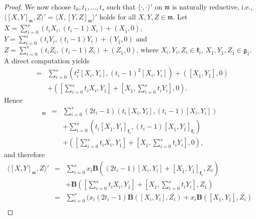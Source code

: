 \documentclass[reqno]{amsart}
\theoremstyle{definition}
\begin{document}
\begin{proof}
We now choose $t_{0},t_{1},\ldots,t_{s}$ such that  $\langle\cdot,\cdot\rangle'$ on $\mathfrak{m}$ is naturally reductive, i.e., $\langle [X,Y]_{\mathfrak{m}},Z\rangle'=\langle X,[Y,Z]_{\mathfrak{m}}\rangle'$ holds for all $X,Y,Z\in\mathfrak{m}$. Let
$X=\sum_{i=0}^{s}(t_{i}X_{i},(t_{i}-1)X_{i})+(X_{\bar{1}},0)$,
$Y=\sum_{i=0}^{s}(t_{i}Y_{i},(t_{i}-1)Y_{i})+(Y_{\bar{1}},0)$
and $Z=\sum_{i=0}^{s}(t_{i}Z_{i},(t_{i}-1)Z_{i})+(Z_{\bar{1}},0)$,
where $X_{i},Y_{i},Z_{i}\in\mathfrak{k}_{i}$, $X_{\bar{1}},Y_{\bar{1}},Z_{\bar{1}}\in\mathfrak{g}_{\bar{1}}$.
A direct computation yields
\begin{eqnarray*}
[X,Y]&=& \sum_{i=0}^{s}\left( t_{i}^{2}[X_{i},Y_{i}],(t_{i}-1)^{2}[X_{i},Y_{i}] \right)
         +\left( [X_{\bar{1}},Y_{\bar{1}}],0\right) \\
      && +\left(
         \left[\sum_{i=0}^{s}t_{i}X_{i},Y_{\bar{1}}\right] +\left[ X_{\bar{1}},\sum_{i=0}^{s}t_{i}Y_{i}\right], 0
         \right).
\end{eqnarray*}
Hence
\begin{eqnarray*}
[X,Y]_{\mathfrak{m}}&=& \sum_{i=0}^{s}(2t_{i}-1)\left( t_{i}[X_{i},Y_{i}],(t_{i}-1)[X_{i},Y_{i}]\right)\\
                     && +\sum_{i=0}^{s} \left( t_{i}[X_{\bar{1}},Y_{\bar{1}}]_{\mathfrak{k}_{i}},(t_{i}-1)[X_{\bar{1}},Y_{\bar{1}}]_{\mathfrak{k}_{i}}\right)\\
                     && +\left(
                         \left[ \sum_{i=0}^{s}t_{i}X_{i},Y_{\bar{1}}\right] +\left[ X_{\bar{1}},\sum_{i=0}^{s}t_{i}Y_{i}\right],0
                         \right),
\end{eqnarray*}
and therefore
\begin{eqnarray*}
\langle [X,Y]_{\mathfrak{m}},Z\rangle'&=&\sum_{i=0}^{s} x_{i}\mathbf{B}\left(
                                          (2t_{i}-1)[X_{i},Y_{i}]+[X_{\bar{1}},Y_{\bar{1}}]_{\mathfrak{k}_{i}},Z_{i}
                                          \right) \\
                                      && +\mathbf{B}\left(
                                           \left[ \sum_{i=0}^{s}t_{i}X_{i},Y_{\bar{1}}\right]+\left[ X_{\bar{1}},\sum_{i=0}^{s}t_{i}Y_{i}\right] ,Z_{\bar{1}}
                                          \right)\\
                                       &=&\sum_{i=0}^{s}\Big(
                                              x_{i}(2t_{i}-1)\mathbf{B}([X_{i},Y_{i}],Z_{i})+x_{i}\mathbf{B}([X_{\bar{1}},Y_{\bar{1}}],Z_{i}) \\

\end{eqnarray*}
\end{proof}
\end{document}
